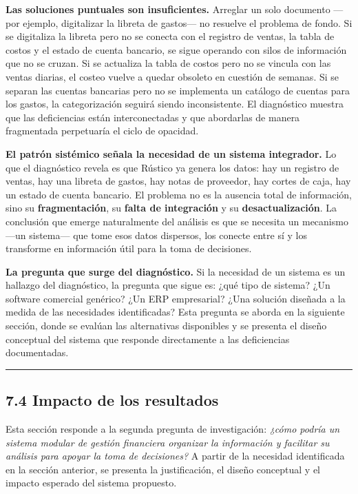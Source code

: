 \documentclass[
  12pt,
  spanish,
]{article}
\begin{document}
\textbf{Las soluciones puntuales son insuficientes.} Arreglar un solo
documento ---por ejemplo, digitalizar la libreta de gastos--- no
resuelve el problema de fondo. Si se digitaliza la libreta pero no se
conecta con el registro de ventas, la tabla de costos y el estado de
cuenta bancario, se sigue operando con silos de información que no se
cruzan. Si se actualiza la tabla de costos pero no se vincula con las
ventas diarias, el costeo vuelve a quedar obsoleto en cuestión de
semanas. Si se separan las cuentas bancarias pero no se implementa un
catálogo de cuentas para los gastos, la categorización seguirá siendo
inconsistente. El diagnóstico muestra que las deficiencias están
interconectadas y que abordarlas de manera fragmentada perpetuaría el
ciclo de opacidad.

\textbf{El patrón sistémico señala la necesidad de un sistema
integrador.} Lo que el diagnóstico revela es que Rústico ya genera los
datos: hay un registro de ventas, hay una libreta de gastos, hay notas
de proveedor, hay cortes de caja, hay un estado de cuenta bancario. El
problema no es la ausencia total de información, sino su
\textbf{fragmentación}, su \textbf{falta de integración} y su
\textbf{desactualización}. La conclusión que emerge naturalmente del
análisis es que se necesita un mecanismo ---un sistema--- que tome esos
datos dispersos, los conecte entre sí y los transforme en información
útil para la toma de decisiones.

\textbf{La pregunta que surge del diagnóstico.} Si la necesidad de un
sistema es un hallazgo del diagnóstico, la pregunta que sigue es: ¿qué
tipo de sistema? ¿Un software comercial genérico? ¿Un ERP empresarial?
¿Una solución diseñada a la medida de las necesidades identificadas?
Esta pregunta se aborda en la siguiente sección, donde se evalúan las
alternativas disponibles y se presenta el diseño conceptual del sistema
que responde directamente a las deficiencias documentadas.

\begin{center}\rule{0.5\linewidth}{0.5pt}\end{center}

\hypertarget{impacto-de-los-resultados}{%
\subsection{7.4 Impacto de los
resultados}\label{impacto-de-los-resultados}}

Esta sección responde a la segunda pregunta de investigación:
\emph{¿cómo podría un sistema modular de gestión financiera organizar la
información y facilitar su análisis para apoyar la toma de decisiones?}
A partir de la necesidad identificada en la sección anterior, se
presenta la justificación, el diseño conceptual y el impacto esperado
del sistema propuesto.
\end{document}
